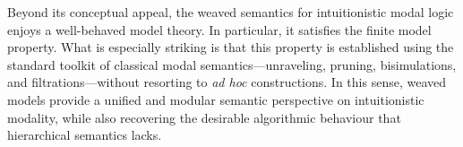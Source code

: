 Beyond its conceptual appeal, the weaved semantics for intuitionistic modal logic enjoys a well-behaved model theory. In particular, it satisfies the finite model property. What is especially striking is that this property is established using the standard toolkit of classical modal semantics---unraveling, pruning, bisimulations, and filtrations---without resorting to \emph{ad hoc} constructions. In this sense, weaved models provide a unified and modular semantic perspective on intuitionistic modality, while also recovering the desirable algorithmic behaviour that hierarchical semantics lacks.


